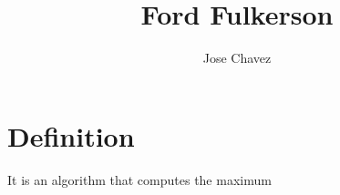 \documentclass{article}
\title{Ford Fulkerson}
\author{Jose Chavez}
\begin{document}
    \maketitle
    \section{Definition}
    It is an algorithm that computes the maximum
\end{document}

